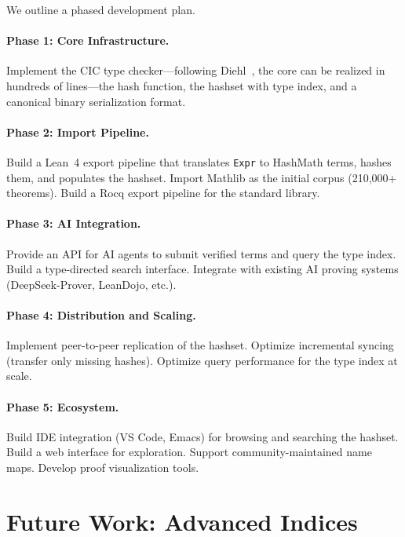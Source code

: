 \documentclass[11pt]{article}
\theoremstyle{definition}
\theoremstyle{plain}
\theoremstyle{remark}
\begin{document}
We outline a phased development plan.

\paragraph{Phase 1: Core Infrastructure.}
Implement the CIC type checker---following Diehl~\cite{diehl200lines}, the core can be realized in
hundreds of lines---the hash function, the hashset with type index, and a canonical binary
serialization format.

\paragraph{Phase 2: Import Pipeline.}
Build a Lean~4 export pipeline that translates \texttt{Expr} to HashMath terms, hashes them,
and populates the hashset.
Import Mathlib as the initial corpus (210,000+ theorems).
Build a Rocq export pipeline for the standard library.

\paragraph{Phase 3: AI Integration.}
Provide an API for AI agents to submit verified terms and query the type index.
Build a type-directed search interface.
Integrate with existing AI proving systems (DeepSeek-Prover, LeanDojo, etc.).

\paragraph{Phase 4: Distribution and Scaling.}
Implement peer-to-peer replication of the hashset.
Optimize incremental syncing (transfer only missing hashes).
Optimize query performance for the type index at scale.

\paragraph{Phase 5: Ecosystem.}
Build IDE integration (VS Code, Emacs) for browsing and searching the hashset.
Build a web interface for exploration.
Support community-maintained name maps.
Develop proof visualization tools.


\section{Future Work: Advanced Indices}
\label{sec:indices}
\end{document}
